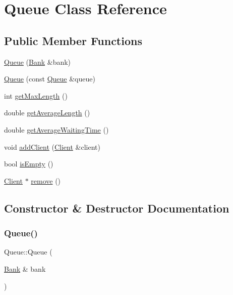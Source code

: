 \hypertarget{classQueue}{}\section{Queue Class Reference}
\label{classQueue}
\subsection*{Public Member Functions}
\begin{DoxyCompactItemize}
\item 
\hyperlink{classQueue_ae2647f6001471e160dc95362aba43313}{Queue} (\hyperlink{classBank}{Bank} \&bank)
\item 
\hyperlink{classQueue_a4d325dcdfe0550824d529b7aa11535b8}{Queue} (const \hyperlink{classQueue}{Queue} \&queue)
\item 
int \hyperlink{classQueue_ac52fd0970c24510a4d0d3086b027021a}{get\+Max\+Length} ()
\item 
double \hyperlink{classQueue_afc73e60fa330498b5efdbf267d4508c2}{get\+Average\+Length} ()
\item 
double \hyperlink{classQueue_a21c1c1c4732177f6b8d8433ae5b4d771}{get\+Average\+Waiting\+Time} ()
\item 
void \hyperlink{classQueue_aa4545b1d42237801b75e0f20c3cc0587}{add\+Client} (\hyperlink{classClient}{Client} \&client)
\item 
bool \hyperlink{classQueue_a65d9b23c23c917faa44981539bc34be7}{is\+Empty} ()
\item 
\hyperlink{classClient}{Client} $\ast$ \hyperlink{classQueue_a2767e32f2c7f51eedf0b75af9d944f67}{remove} ()
\end{DoxyCompactItemize}


\subsection{Constructor \& Destructor Documentation}
\mbox{\label{classQueue_ae2647f6001471e160dc95362aba43313}} 
\subsubsection{\texorpdfstring{Queue()}{Queue()}\hspace{0.1cm}{\footnotesize\ttfamily [1/2]}}
{\footnotesize\ttfamily Queue\+::\+Queue (\begin{DoxyParamCaption}\item[{\hyperlink{classBank}{Bank} \&}]{bank }\end{DoxyParamCaption})\hspace{0.3cm}{\ttfamily [explicit]}}

